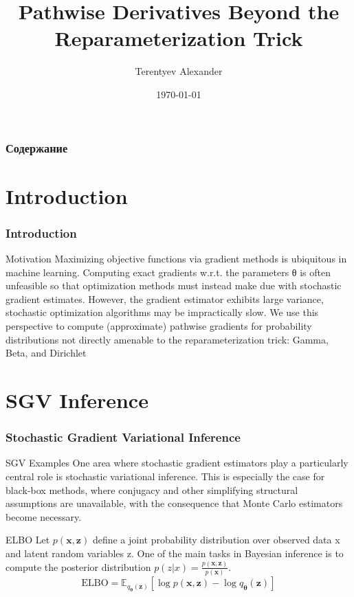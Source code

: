 \documentclass{beamer}
\title{Pathwise Derivatives Beyond the Reparameterization Trick}
\author{Terentyev Alexander}
\date{\today}
\begin{document}
\begin{frame}
    \titlepage
\end{frame}

\begin{frame}
    \frametitle{Содержание}
    \tableofcontents
\end{frame}

\section{Introduction}
\begin{frame}
    \frametitle{Introduction}
    \begin{block}{Motivation}
        Maximizing objective functions via gradient methods is ubiquitous in machine learning. Computing exact gradients w.r.t. the parameters θ is often unfeasible so that optimization methods must instead make due with stochastic gradient estimates. However, the gradient estimator exhibits large variance, stochastic optimization algorithms may be impractically slow. We use this perspective to compute (approximate) pathwise gradients for probability distributions not directly amenable to the reparameterization trick: Gamma, Beta, and Dirichlet
    \end{block}
\end{frame}

\section{SGV Inference}
\begin{frame}
    \frametitle{Stochastic Gradient Variational
Inference}
    \begin{block}{SGV Examples}
         One area where stochastic gradient estimators play a particularly central role is stochastic variational inference. This is especially the case for black-box methods, where conjugacy and other simplifying structural assumptions are unavailable, with the consequence that Monte Carlo estimators become necessary.
    \end{block}
    \begin{block}{ELBO}
        Let $p(\mathbf{x}, \mathbf{z})$ define a joint probability distribution over observed data x and latent random variables z. One of the main tasks in Bayesian inference is to compute the posterior distribution $p(z|x) = \frac{p(\mathbf{x},\mathbf{z})}{p(\mathbf{x})}$.
         $$\text{ELBO} = \mathbb{E}_{q_{\mathbf{\theta}}(\mathbf{z})} \left[ \log p(\mathbf{x}, \mathbf{z}) - \log q_{\mathbf{\theta}}(\mathbf{z}) \right]$$
    \end{block}
\end{frame}
\end{document}
